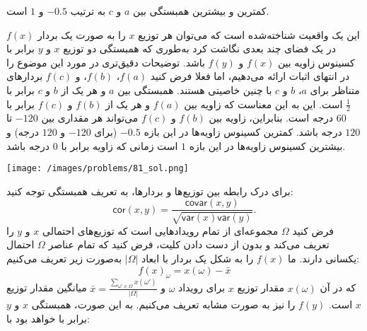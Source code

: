 \begin{solution}

کمترین و بیشترین همبستگی بین $ a $ و $ c $ به ترتیب $-0.5$ و $ 1 $ است.



این یک واقعیت شناخته‌شده است که می‌توان هر توزیع $x$ را به‌ صورت یک بردار $f(x)$ در یک فضای چند بعدی نگاشت کرد به‌طوری که همبستگی دو توزیع $x$ و $y$ برابر با کسینوس زاویه بین $ f(x) $ و $ f(y) $ باشد. توضیحات دقیق‌تری در مورد این موضوع را در انتهای اثبات ارائه می‌دهیم، اما فعلا فرض کنید $ f(a) $، $ f(b) $، و $ f(c) $ بردارهای متناظر برای $ a $، $ b $ و $ c $ با چنین خاصیتی هستند. همبستگی‌ بین $ a $ و هر یک از $ b $ و $ c $ برابر با $ \frac{1}{2} $ است. این به این معناست که زاویه‌ بین $ f(a) $ و هر یک از $ f(b) $ و $ f(c) $ برابر با 60 درجه است. بنابراین، زاویه بین $ f(b) $ و $ f(c) $ می‌تواند هر مقداری بین $-120$ تا $120$ درجه باشد. کمترین کسینوس زاویه‌ها در این بازه $-0.5$ (برای $-120$ و $120$ درجه) و بیشترین کسینوس زاویه‌ها در این بازه $1$ است زمانی که زاویه برابر با 0 درجه باشد.

\begin{center}
	\texttt{[image: /images/problems/81\_sol.png]}
\end{center}



برای درک رابطه بین توزیع‌ها و بردارها، به تعریف همبستگی توجه کنید:
$$\textsf{cor}(x,y) = \frac{\mathsf{covar}(x,y)}{\sqrt{\mathsf{var}(x)\mathsf{var}(y)}}.$$
فرض کنید $\Omega$ مجموعه‌ای از تمام رویدادهایی است که توزیع‌های احتمالی $x$ و $y$ را تعریف می‌کند و بدون از دست دادن کلیت، فرض کنید که تمام عناصر $\Omega$ احتمال یکسانی دارند. ما $f(x)$ را به‌ شکل یک بردار با ابعاد $|\Omega|$ به‌صورت زیر تعریف می‌کنیم:
$$f(x)_{\omega} = x(\omega) - \bar{x}$$
که در آن $x(\omega)$ مقدار توزیع $x$ برای رویداد $\omega$ و $\bar{x} = \frac{\sum_{\omega' \in \Omega} x(\omega')}{|\Omega|}$ میانگین مقدار توزیع $x$ است. $f(y)$ را نیز به‌ صورت مشابه تعریف می‌کنیم. به این صورت، همبستگی $x$ و $y$ برابر با خواهد بود با:


\end{solution}
